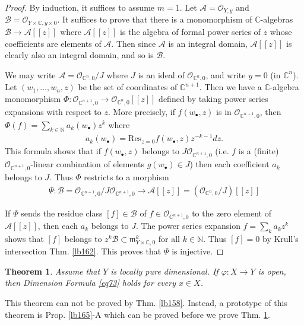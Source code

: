 \documentclass[12pt,b5paper,notitlepage]{report}
\theoremstyle{definition}
\theoremstyle{plain}
\newtheorem{thm}[df]{Theorem}
\newcommand{\fk}{\mathfrak}
\newcommand{\Res}{\mathrm{Res}}
\newcommand{\scr}{\mathscr}
\newcommand{\blt}{\bullet}
\newcommand{\Cbb}{\mathbb C}
\newcommand{\Nbb}{\mathbb N}
\numberwithin{equation}{section}
\begin{document}
\begin{proof}
By induction, it suffices to assume $m=1$. Let $\scr A=\scr O_{Y,y}$ and $\scr B=\scr O_{Y\times\Cbb,y\times 0}$. It suffices to prove that there is a monomorphism of $\Cbb$-algebras $\scr B\rightarrow \scr A[[z]]$ where $\scr A[[z]]$ is the algebra of formal power series of $z$ whose coefficients are elements of $\scr A$. Then since $\scr A$ is an integral domain, $\scr A[[z]]$ is clearly also an integral domain, and so is $\scr B$.

We may write $\scr A=\scr O_{\Cbb^n,0}/J$ where $J$ is an ideal of $\scr O_{\Cbb^n,0}$, and write $y=0$ (in $\Cbb^n$). Let $(w_1,\dots,w_n,z)$ be the set of coordinates of $\Cbb^{n+1}$. Then we have a $\Cbb$-algebra monomorphism $\Phi:\scr O_{\Cbb^{n+1},0}\rightarrow\scr O_{\Cbb^n,0}[[z]]$ defined by taking power series expansions with respect to $z$. More precisely, if $f(w_\blt,z)$ is in $\scr O_{\Cbb^{n+1},0}$, then $\Phi(f)=\sum_{k\in\Nbb} a_k(w_\blt)z^k$ where
\begin{align*}
a_k(w_\blt)=\Res_{z=0}f(w_\blt,z)z^{-k-1}dz.
\end{align*}
This formula shows that if $f(w_\blt,z)$ belongs to $J\scr O_{\Cbb^{n+1},0}$ (i.e. $f$ is a (finite) $\scr O_{\Cbb^{n+1},0}$-linear combination of elements $g(w_\blt)\in J$) then each coefficient $a_k$ belongs to $J$. Thus $\Phi$ restricts to a morphism
\begin{align*}
\Psi:\scr B=\scr O_{\Cbb^{n+1},0}/J\scr O_{\Cbb^{n+1},0}\rightarrow\scr A[[z]]=(\scr O_{\Cbb^n,0}/J)[[z]]
\end{align*} 

If $\Psi$ sends the residue class $[f]\in\scr B$ of $f\in\scr O_{\Cbb^{n+1},0}$ to the zero element of $\scr A[[z]]$, then each $a_k$ belongs to $J$. The power series expansion $f=\sum_k a_kz^k$ shows that $[f]$ belongs to $z^k\scr B\subset\fk m_{Y\times\Cbb,0}^k$ for all $k\in\Nbb$. Thus $[f]=0$ by Krull's intersection Thm. \ref{lb162}. This proves that $\Psi$ is injective.
\end{proof}


\begin{thm}\label{lb164}
Assume that $Y$ is locally pure dimensional. If $\varphi:X\rightarrow Y$ is open, then Dimension Formula \eqref{eq73} holds for every $x\in X$. 
\end{thm}

This theorem can not be proved by Thm. \ref{lb158}. Instead, a prototype of this theorem is Prop. \ref{lb165}-A which can be proved before we prove Thm. \ref{lb164}.
\end{document}
